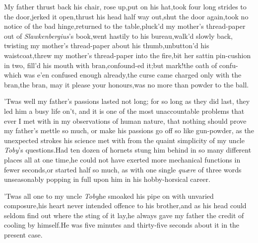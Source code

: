 \documentclass{article}
\begin{document}
\tsh My father thrust back his chair,\break
\tsh rose up,\tsk put on his
hat,\tsk took four long strides to the
door,\tsk jerked it open,\tsk thrust his head half
way out,\tsk shut the door again,\tsk took no
notice of the bad hinge,\tsk returned to the
table,\tsk\break pluck’d my mother’s thread-paper out of
\textit{Slawkenbergius}’s book,\tsk went hastily to his
bureau,\tsk walk’d slowly back, twisting my mother’s
thread-paper about his thumb,\tsk unbutton’d his
waistcoat,\tsh threw my mother’s thread-paper into the
fire,\tsk bit her sattin pin-cushion in two, fill’d
his mouth with bran,\tsk confound-\break ed it;\tsk but mark!\tsk the
oath of confu-
\tsh which was e’en confused enough already,\tsh the curse
came charged only with the bran,\tsk the bran, may it please
your honours,\tsk was no more than powder to the ball.

’Twas well my father’s passions lasted not long; for
so long as they did last, they led him a busy life on’t, and
it is one of the most unaccountable problems that ever I met with
in my observations of human nature, that nothing should prove my
father’s mettle so much, or make his passions go off so like
gun-powder, as the unexpected strokes his science met with from the
quaint simplicity of my uncle \textit{Toby}’s
questions.\tsh Had ten dozen of hornets stung him behind
in so many different places all at one time,\tsk he could not have
exerted more mechanical functions in fewer seconds,\tsk or
started half so much, as with one single \textit{quære} of
three words unseasonably popping in full upon him in his
hobby-horsical career.

’Twas all one to my uncle \textit{Toby}\tsk he
smoaked his pipe on with unvaried composure,\tsk his heart
never intended offence to his brother,\tsk and as his head could
seldom find out where the sting of it lay,\break\tsh he always
gave my father the credit of cooling by himself.\tsh He
was five minutes and thirty-five seconds about it in the present
case.
\end{document}
